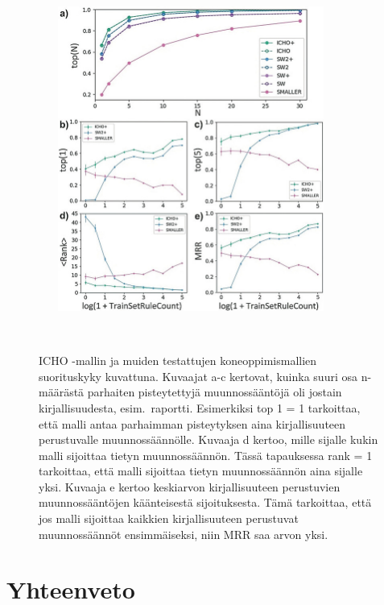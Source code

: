 \documentclass[finnish,twoside,censored,tkt,sw-line]{HYthesisML}
\begin{document}
\begin{figure}[!ht]
    \centering
    \includegraphics[width=10cm, height=10cm]{icho-performance-fig.jpg}
    \caption{
        ICHO -mallin ja muiden testattujen koneoppimismallien suorituskyky kuvattuna.
        Kuvaajat a-c kertovat, kuinka suuri osa n-määrästä parhaiten pisteytettyjä muunnossääntöjä oli jostain kirjallisuudesta, esim.\ raportti.
        Esimerkiksi top 1 = 1 tarkoittaa, että malli antaa parhaimman pisteytyksen aina kirjallisuuteen perustuvalle muunnossäännölle.
        Kuvaaja d kertoo, mille sijalle kukin malli sijoittaa tietyn muunnossäännön.
        Tässä tapauksessa rank = 1 tarkoittaa, että malli sijoittaa tietyn muunnossäännön aina sijalle yksi.
        Kuvaaja e kertoo keskiarvon kirjallisuuteen perustuvien muunnossääntöjen käänteisestä sijoituksesta.
        Tämä tarkoittaa, että jos malli sijoittaa kaikkien kirjallisuuteen perustuvat muunnossäännöt ensimmäiseksi, niin MRR saa arvon yksi.
    }
    {~\cite{ExpertKnowledgeRetorsynthesis}}
    \label{fig:icho-performance}
\end{figure}

\chapter{Yhteenveto}


\end{document}
